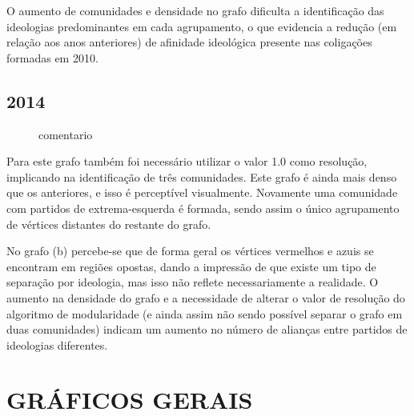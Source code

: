 O aumento de comunidades e densidade no grafo dificulta a identificação das ideologias predominantes em cada agrupamento, o que evidencia a redução (em relação aos anos anteriores) de afinidade ideológica presente nas coligações formadas em 2010.



\subsection{2014}
\label{resultados__grafos--2014}

\begin{figure}[H]
\center
    \qquad

    \caption{comentario}
\end{figure}

Para este grafo também foi necessário utilizar o valor 1.0 como resolução, implicando na identificação de três comunidades. Este grafo é ainda mais denso que os anteriores, e isso é perceptível visualmente. Novamente uma comunidade com partidos de extrema-esquerda é formada, sendo assim o único agrupamento de vértices distantes do restante do grafo.

No grafo (b) percebe-se que de forma geral os vértices vermelhos e azuis se encontram em regiões opostas, dando a impressão de que existe um tipo de separação por ideologia, mas isso não reflete necessariamente a realidade. O aumento na densidade do grafo e a necessidade de alterar o valor de resolução do algoritmo  de modularidade (e ainda assim não sendo possível separar o grafo em duas comunidades) indicam um aumento no número de alianças entre partidos de ideologias diferentes.

\section{\texorpdfstring{\MakeUppercase{Gráficos Gerais}}{}}
\label{resultados__graficos-gerais}
